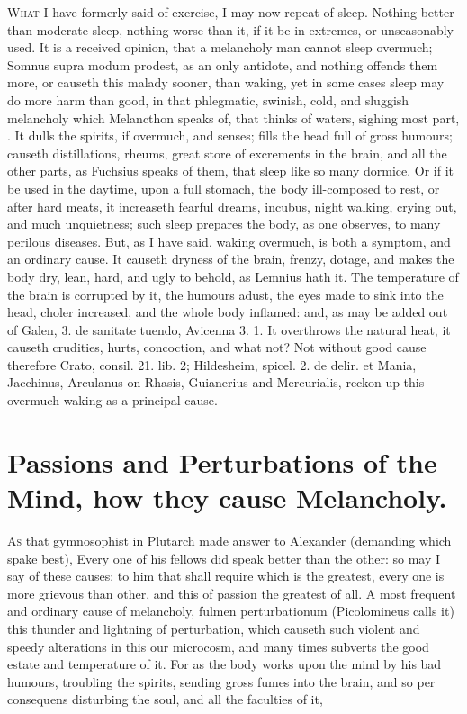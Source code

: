 {{\lettrine{W}{hat} I have formerly said of exercise, I may now repeat of sleep.
Nothing better than moderate sleep, nothing worse than it, if it be in
extremes, or unseasonably used. It is a received opinion, that a
melancholy man cannot sleep overmuch; Somnus supra modum prodest, as an
only antidote, and nothing offends them more, or causeth this malady
sooner, than waking, yet in some cases sleep may do more harm than
good, in that phlegmatic, swinish, cold, and sluggish melancholy which
Melancthon speaks of, that thinks of waters, sighing most part, \etc{}.
It dulls the spirits, if overmuch, and senses; fills the head
full of gross humours; causeth distillations, rheums, great store of
excrements in the brain, and all the other parts, as Fuchsius
speaks of them, that sleep like so many dormice. Or if it be used in
the daytime, upon a full stomach, the body ill-composed to rest, or
after hard meats, it increaseth fearful dreams, incubus, night walking,
crying out, and much unquietness; such sleep prepares the body, as
one observes, to many perilous diseases. But, as I have said,
waking overmuch, is both a symptom, and an ordinary cause. It causeth
dryness of the brain, frenzy, dotage, and makes the body dry, lean,
hard, and ugly to behold, as Lemnius hath it. The temperature of
the brain is corrupted by it, the humours adust, the eyes made to sink
into the head, choler increased, and the whole body inflamed: and, as
may be added out of Galen, 3. de sanitate tuendo, Avicenna 3. 1.
It overthrows the natural heat, it causeth crudities, hurts,
concoction, and what not? Not without good cause therefore Crato,
consil. 21. lib. 2; Hildesheim, spicel. 2. de delir. et Mania,
Jacchinus, Arculanus on Rhasis, Guianerius and Mercurialis, reckon up
this overmuch waking as a principal cause.


\section{Passions and Perturbations of the Mind, how they cause Melancholy.}

\lettrine{A}{s} that gymnosophist in Plutarch made answer to Alexander
(demanding which spake best), Every one of his fellows did speak better
than the other: so may I say of these causes; to him that shall require
which is the greatest, every one is more grievous than other, and this
of passion the greatest of all. A most frequent and ordinary cause of
melancholy,  fulmen perturbationum (Picolomineus calls it) this
thunder and lightning of perturbation, which causeth such violent and
speedy alterations in this our microcosm, and many times subverts the
good estate and temperature of it. For as the body works upon the mind
by his bad humours, troubling the spirits, sending gross fumes into the
brain, and so per consequens disturbing the soul, and all the faculties
of it,

}}

